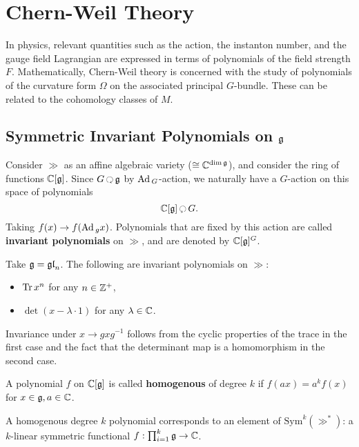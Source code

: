 		\section{Chern-Weil Theory}
		
		In physics, relevant quantities such as the action, the instanton number, and the gauge field Lagrangian are expressed in terms of polynomials of the field strength $F$. Mathematically, Chern-Weil theory is concerned with the study of polynomials of the curvature form $\Omega$ on the associated principal $G$-bundle. These can be related to the cohomology classes of $M$.
		
		\subsection{Symmetric Invariant Polynomials on $\frak g$}
		
		Consider $\gg$ as an affine algebraic variety ($\cong \mathbb{C}^{\dim \frak{g}}$), and consider the ring of functions $\mathbb{C} [\frak{g}]$. Since $G \lacts \gg$ by $\mathrm{Ad}\,_G$-action, we naturally have a $G$-action on this space of polynomials
		\[
			\cc [\gg] \racts G.
		\]
		Taking $f(x) \to f(\mathrm{Ad}\,_g x)$. Polynomials that are fixed by this action are called \textbf{invariant polynomials} on $\gg$, and are denoted by $\mathbb{C}[\frak{g}]^G$.
		
		\begin{eg}
			Take $\frak{g} = \frak{gl}_n$. The following are invariant polynomials on $\gg$:
			\begin{itemize}
				\item $\mathrm{Tr}\, x^n$ for any $n \in \mathbb{Z}^+$,
				\item $\det (x - \lambda \cdot 1)$ for any  $\lambda \in \mathbb{C}$.
			\end{itemize}
			Invariance under $x \to gxg^{-1}$ follows from the cyclic properties of the trace in the first case and the fact that the determinant map is a homomorphism in the second case.
		\end{eg}
		
		\begin{defn}
			A polynomial $f$ on $\mathbb{C}[\frak{g}]$ is called \textbf{homogenous} of degree $k$ if $f(a x) = a^k f(x)$ for $x \in \frak{g}, a \in \mathbb{C}$.
		\end{defn}
		
		\begin{obs}
			A homogenous degree $k$ polynomial corresponds to an element of $\mathrm{Sym}^k (\gg^*)$: a $k$-linear symmetric functional $f: \prod_{i=1}^k \frak{g} \to \mathbb{C}$.
		\end{obs}
		
